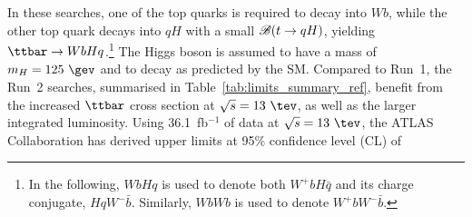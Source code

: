In these searches, one of the top quarks is required to decay into $Wb$, while the other top quark decays into $qH$ with a small $\mathscr{B}(t\to qH)$, yielding $\ttbar \to WbHq$.\footnote{In the following, $WbHq$ is used to denote both $W^+b H\bar{q}$ and its charge conjugate, $HqW^- \bar{b}$. Similarly, 
$WbWb$ is used to denote $W^+b W^- \bar{b}$.}  The Higgs boson is assumed to have a mass of $m_H=125~\gev$ and to decay as predicted by
the SM.
Compared to Run~1, the Run~2 searches, summarised in Table~\ref{tab:limits_summary_ref}, benefit from the increased $\ttbar$ cross section at $\sqrt{s}=13~\tev$, as well as the larger integrated luminosity.
Using 36.1~fb$^{-1}$ of data at $\sqrt{s}=13~\tev$, the ATLAS Collaboration has derived upper limits at 95\% confidence level (CL) of
